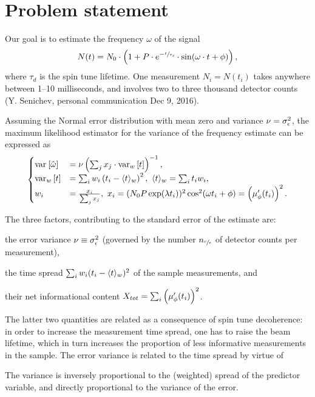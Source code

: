 \documentclass{article}
\begin{document}
	
\section*{Problem statement}

Our goal is to estimate the frequency $\omega$ of the signal
\begin{equation}\label{eq:Signal}
	N(t) = N_0\cdot\bkt{1 + P\cdot e^{-\sfrac{t}{\tau_d}}\cdot\sin(\omega\cdot t + \phi)},
\end{equation}
where $\tau_d$ is the spin tune lifetime. One measurement $N_i = N(t_i)$ takes anywhere between 1--10 milliseconds, and involves two to three thousand detector counts (Y. Senichev, personal communication Dec 9, 2016).

Assuming the Normal error distribution with mean zero and variance $\nu = \SD{\meas}^2$, the maximum likelihood estimator for the variance of the frequency estimate can be expressed as
\begin{equation}
\begin{cases}
\var{\hat\omega} &= \nu\bkt{\sum_j x_j\cdot \var[w]{t}}^{-1}, \\
\var[w]{t} &= \sum_i w_i \bkt{t_i - \avg{t}_w}^2,~ \avg{t}_w = \sum_i t_i w_i, \\
w_i &= \frac{x_i}{\sum_j x_j},~ x_i = (N_0P\exp(\lambda t_i))^2\cos^2(\omega t_i + \phi) = \bkt{\mupp}^2.
\end{cases}	
\end{equation}

The three factors, contributing to the standard error of the estimate are:
\begin{inparaenum}
	\item the error variance $\nu \equiv \SD{\meas}^2$ (governed by the number $n_{\sfrac{c}{\epsilon}}$ of detector counts per measurement), 
	\item the time spread $\sum_i w_i (t_i - \langle t\rangle_w)^2$ of the sample measurements, and
	\item their net informational content $X_{tot} = \sum_i \bkt{\mupp}^2$.
\end{inparaenum}

The latter two quantities are related as a consequence of spin tune decoherence: in order to increase the measurement time spread, one has to raise the beam lifetime, which in turn increases the proportion of less informative measurements in the sample. The error variance is related to the time spread by virtue of 


The variance is inversely proportional to the (weighted) spread of the predictor variable, and directly proportional to the variance of the error. 
\end{document}
